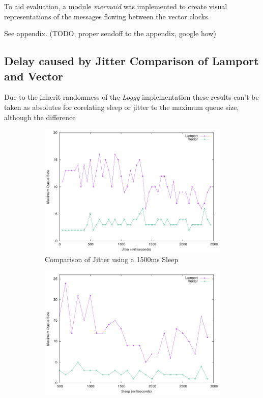 \documentclass[a4paper, 11pt]{article}
\begin{document}
To aid evaluation, a module \textit{mermaid} was implemented to create visual representations of the messages flowing between the vector clocks.

See appendix. (TODO, proper sendoff to the appendix, google how)

\subsection{Delay caused by Jitter Comparison of Lamport and Vector}

Due to the inherit randomness of the \textit{Loggy} implementation these results can't be taken as absolutes for corelating sleep or jitter to the maximum queue size, although the difference 

\begin{figure}[H]
  \begin{center}
    \begin{subfigure}[b]{0.494\textwidth}
      \centering
      \includegraphics[width=\textwidth]{test/jitter.pdf}
      \caption{Comparison of Jitter using a 1500ms Sleep}
      \label{fig:results1}
    \end{subfigure}
    \hfill
    \begin{subfigure}[b]{0.494\textwidth}
      \centering
      \includegraphics[width=\textwidth]{test/sleep.pdf}

\end{subfigure}
\end{center}
\end{figure}
\end{document}
